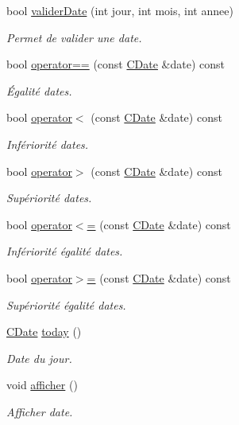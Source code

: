 \begin{DoxyCompactItemize}
bool \hyperlink{class_c_date_a45a71c91bd790e7b84405c8128e4094b}{validerDate} (int jour, int mois, int annee)
\begin{DoxyCompactList}\small\item\em Permet de valider une date. \item\end{DoxyCompactList}\item 
bool \hyperlink{class_c_date_a82e5b049e86145b62893f194b5638ad6}{operator==} (const \hyperlink{class_c_date}{CDate} \&date) const 
\begin{DoxyCompactList}\small\item\em Égalité dates. \item\end{DoxyCompactList}\item 
bool \hyperlink{class_c_date_a2764c65e43a4ee956cd16f8ce242dbc7}{operator$<$} (const \hyperlink{class_c_date}{CDate} \&date) const 
\begin{DoxyCompactList}\small\item\em Infériorité dates. \item\end{DoxyCompactList}\item 
bool \hyperlink{class_c_date_ac653ba135b3681a64448872b2d6a0c17}{operator$>$} (const \hyperlink{class_c_date}{CDate} \&date) const 
\begin{DoxyCompactList}\small\item\em Supériorité dates. \item\end{DoxyCompactList}\item 
bool \hyperlink{class_c_date_a8fcb0b615460c60f3f4db15eb197011b}{operator$<$=} (const \hyperlink{class_c_date}{CDate} \&date) const 
\begin{DoxyCompactList}\small\item\em Infériorité égalité dates. \item\end{DoxyCompactList}\item 
bool \hyperlink{class_c_date_ac0553a16a486d0ec1c375846821ef460}{operator$>$=} (const \hyperlink{class_c_date}{CDate} \&date) const 
\begin{DoxyCompactList}\small\item\em Supériorité égalité dates. \item\end{DoxyCompactList}\item 
\hyperlink{class_c_date}{CDate} \hyperlink{class_c_date_a00a40e811874a7b1cca4461cbcee1356}{today} ()
\begin{DoxyCompactList}\small\item\em Date du jour. \item\end{DoxyCompactList}\item 
void \hyperlink{class_c_date_a9b58a7c96cf53352328906e30891e4e4}{afficher} ()
\begin{DoxyCompactList}\small\item\em Afficher date. \item\end{DoxyCompactList}\end{DoxyCompactItemize}


